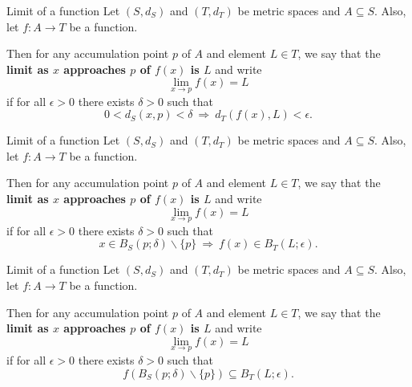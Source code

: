 \documentclass{beamer}
\begin{document}
\begin{frame}{Limit of a function}
Let $(S,d_S)$ and $(T,d_T)$ be metric spaces and $A\subseteq S$.
\pause
Also, let $f: A\rightarrow T$ be a function.
\pause
\begin{defn}
\pause
Then for any accumulation point $p$ of $A$ and element $L\in T$, we say that the \textbf{limit as $x$ approaches $p$ of $f(x)$ is $L$}
\pause
 and write
$$\lim_{x\rightarrow p} f(x) = L$$
\pause
if for all $\epsilon > 0$ there exists $\delta > 0$ such that
$$0 < d_S(x,p) < \delta\ \Rightarrow\ d_T(f(x),L) < \epsilon.$$
\end{defn}
\end{frame}

\begin{frame}{Limit of a function}
Let $(S,d_S)$ and $(T,d_T)$ be metric spaces and $A\subseteq S$.
\pause
Also, let $f: A\rightarrow T$ be a function.
\pause
\begin{defn}
\pause
Then for any accumulation point $p$ of $A$ and element $L\in T$, we say that the \textbf{limit as $x$ approaches $p$ of $f(x)$ is $L$}
\pause
 and write
$$\lim_{x\rightarrow p} f(x) = L$$
\pause
if for all $\epsilon > 0$ there exists $\delta > 0$ such that
$$x\in B_S(p;\delta)\backslash\{p\}\ \Rightarrow\ f(x)\in B_T(L;\epsilon).$$
\end{defn}
\end{frame}

\begin{frame}{Limit of a function}
Let $(S,d_S)$ and $(T,d_T)$ be metric spaces and $A\subseteq S$.
\pause
Also, let $f: A\rightarrow T$ be a function.
\pause
\begin{defn}
\pause
Then for any accumulation point $p$ of $A$ and element $L\in T$, we say that the \textbf{limit as $x$ approaches $p$ of $f(x)$ is $L$}
\pause
 and write
$$\lim_{x\rightarrow p} f(x) = L$$
\pause
if for all $\epsilon > 0$ there exists $\delta > 0$ such that
$$f(B_S(p;\delta)\backslash\{p\})\subseteq B_T(L;\epsilon).$$
\end{defn}
\end{frame}
\end{document}
